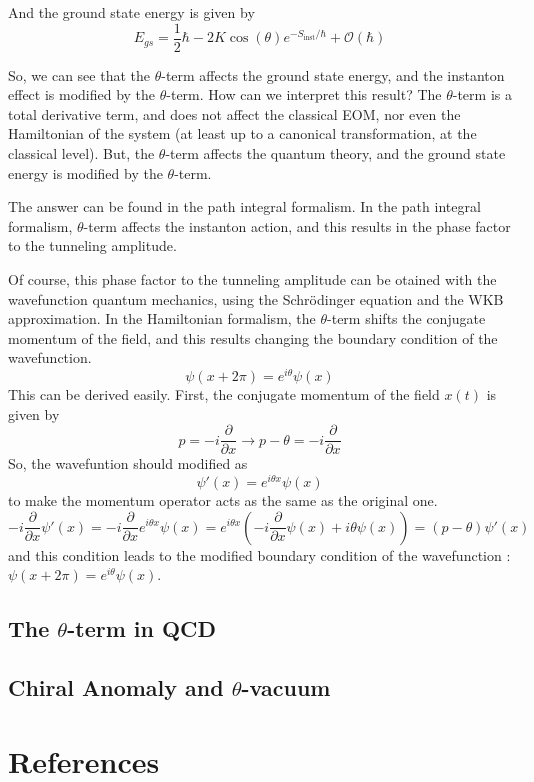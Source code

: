 \documentclass{article}
\begin{document}
And the ground state energy is given by
\[
    E_{gs} = \frac{1}{2}\hbar-2K \cos (\theta ) e^{-S_{\text{inst}}/\hbar}+ \mathcal{O}(\hbar)
\]

So, we can see that the $\theta$-term affects the ground state energy, and the instanton effect is modified by the $\theta$-term.
How can we interpret this result? The $\theta$-term is a total derivative term, and does not affect the classical EOM, nor even the Hamiltonian of the system (at least up to a canonical transformation, at the classical level).
But, the $\theta$-term affects the quantum theory, and the ground state energy is modified by the $\theta$-term.

The answer can be found in the path integral formalism.
In the path integral formalism, $\theta$-term affects the instanton action, and this results in the phase factor to the tunneling amplitude.

Of course, this phase factor to the tunneling amplitude can be otained with the wavefunction quantum mechanics, using the Schrödinger equation and the WKB approximation.
In the Hamiltonian formalism, the $\theta$-term shifts the conjugate momentum of the field, and this results changing the boundary condition of the wavefunction.
\[
    \psi(x+2\pi) = e^{i\theta} \psi(x)
\]
This can be derived easily. First, the conjugate momentum of the field $x(t)$ is given by
\[
    p=-i\frac{\partial}{\partial x} \rightarrow p-\theta=-i\frac{\partial}{\partial x}
\]
So, the wavefuntion should modified as
\[
    \psi'(x) = e^{i\theta x} \psi(x)
\]
to make the momentum operator acts as the same as the original one.
\[
    -i\frac{\partial}{\partial x} \psi'(x) = -i\frac{\partial}{\partial x} e^{i\theta x} \psi(x) = e^{i\theta x} (-i\frac{\partial}{\partial x} \psi(x) + i\theta \psi(x)) = (p-\theta) \psi'(x)
\]
and this condition leads to the modified boundary condition of the wavefunction : $\psi(x+2\pi) = e^{i\theta} \psi(x)$.



\subsubsection{}



\subsection{The $\theta$-term in QCD}


\subsection{Chiral Anomaly and $\theta$-vacuum}

\section{References}
\end{document}
